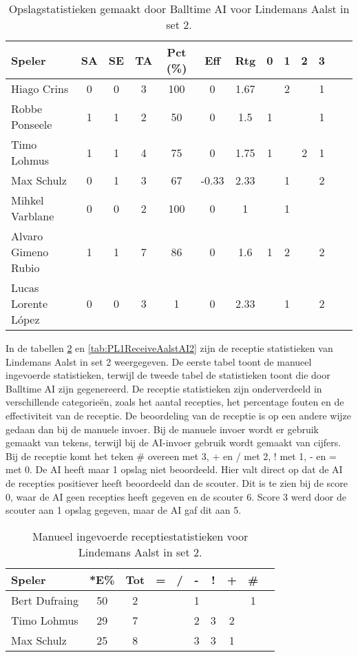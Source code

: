 \begin{table}[ht!]
  \centering
  \scriptsize
  \begin{tabular}{|l|c|c|c|c|c|c|c|c|c|c|c|c|} \hline
    \textbf{Speler} & SA & SE & TA & Pct (\%) & Eff & Rtg & 0 & 1 & 2 & 3 \\ \hline
    Hiago Crins & 0 & 0 & 3 & 100 & 0 & 1.67 &  & 2 &  & 1 \\
    Robbe Ponseele & 1 & 1 & 2 & 50 & 0 & 1.5 & 1 &  &  & 1  \\
    Timo Lohmus & 1 & 1 & 4 & 75 & 0 & 1.75 & 1 & & 2 & 1 \\
    Max Schulz & 0 & 1 & 3 & 67 & -0.33 & 2.33 &  & 1 &  & 2 \\
    Mihkel Varblane & 0 & 0 & 2 & 100 & 0 & 1 &  & 1 &  &   \\
    Alvaro Gimeno Rubio & 1 & 1 & 7 & 86 & 0 & 1.6 & 1 & 2 &  & 2  \\
    Lucas Lorente López & 0 & 0 & 3 & 1 & 0 & 2.33 &  & 1 &  & 2  \\ \hline
  \end{tabular}
  \caption[Opslagstatistieken gemaakt door Balltime AI voor Lindemans Aalst in set 2]{\label{tab:PL1ServeAalstAI2}Opslagstatistieken gemaakt door Balltime AI voor Lindemans Aalst in set 2.}
\end{table}

In de tabellen \ref{tab:PL1ReceiveAalstMan2} en \ref{tab:PL1ReceiveAalstAI2} zijn de receptie statistieken van Lindemans Aalst in set 2 weergegeven. De eerste tabel toont de manueel ingevoerde statistieken, terwijl de tweede tabel de statistieken toont die door Balltime AI zijn gegenereerd. De receptie statistieken zijn onderverdeeld in verschillende categorieën, zoals het aantal recepties, het percentage fouten en de effectiviteit van de receptie. De beoordeling van de receptie is op een andere wijze gedaan dan bij de manuele invoer. Bij de manuele invoer wordt er gebruik gemaakt van tekens, terwijl bij de AI-invoer gebruik wordt gemaakt van cijfers. Bij de receptie komt het teken \# overeen met 3, + en / met 2, ! met 1, - en = met 0. De AI heeft maar 1 opslag niet beoordeeld. Hier valt direct op dat de AI de recepties positiever heeft beoordeeld dan de scouter. Dit is te zien bij de score 0, waar de AI geen recepties heeft gegeven en de scouter 6. Score 3 werd door de scouter aan 1 opslag gegeven, maar de AI gaf dit aan 5.

\begin{table}[ht!]
  \centering
  \scriptsize
    \begin{tabular}{|l|c|c|c|c|c|c|c|c|c|}
      \hline
      \textbf{Speler} & *E\% & Tot & = & / & - & ! & + & \# \\ \hline
      Bert Dufraing  & 50 & 2 &  &  & 1 &  &  & 1 \\ 
      Timo Lohmus  & 29 & 7 &  & & 2 & 3 & 2 &    \\
      Max Schulz  & 25 & 8 &  &  & 3 & 3 & 1 &   \\ \hline
  \end{tabular}
  \caption[Manueel ingevoerde receptiestatistieken voor Lindemans Aalst in set 2]{\label{tab:PL1ReceiveAalstMan2}Manueel ingevoerde receptiestatistieken voor Lindemans Aalst in set 2.}
\end{table}

